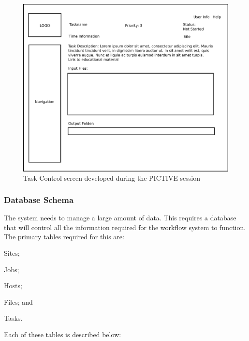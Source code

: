 \documentclass[12pt,a4paper]{report}
\begin{document}
\begin{figure}[!h]
    \begin{center}
        \includegraphics[scale=0.25]{figures/task_overview.pdf}
    \end{center}
    \caption{Task Control screen developed during the PICTIVE session}
    \label{pictive_task}
\end{figure}

\subsubsection{Database Schema\label{db_schema}}
The system needs to manage a large amount of data. This requires
a database that will control all the information required for the
workflow system to function. The primary tables required for this are:
\begin{inparaenum}[(i)]
\item Sites;
\item Jobs;
\item Hosts;
\item Files; and
\item Tasks.
\end{inparaenum}

\noindent Each of these tables is described below:
\newpage
\end{document}
